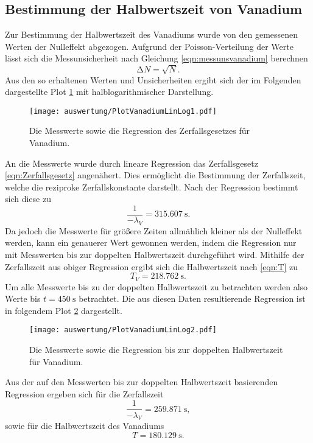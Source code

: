 \subsection{Bestimmung der Halbwertszeit von Vanadium}
  \label{sec:vanadium1}
  Zur Bestimmung der Halbwertszeit des Vanadiums wurde von den gemessenen Werten der Nulleffekt abgezogen. Aufgrund der Poisson-Verteilung der Werte lässt sich die Messunsicherheit nach
  Gleichung \eqref{eqn:messunsvanadium} berechnen
  \begin{equation}
    \label{eqn:messunsvanadium}
    \increment N = \sqrt{N} .
  \end{equation}
  Aus den so erhaltenen Werten und Unsicherheiten ergibt sich der im Folgenden dargestellte Plot \ref{fig:PlotVanadiumLinLog1} mit halblogarithmischer Darstellung.
  \begin{figure}[H]
    \centering
    \texttt{[image: auswertung/PlotVanadiumLinLog1.pdf]}
    \caption{Die Messwerte sowie die Regression des Zerfallsgesetzes für Vanadium.}
    \label{fig:PlotVanadiumLinLog1}
  \end{figure}
  \noindent
  An die Messwerte wurde durch lineare Regression das Zerfallsgesetz \ref{eqn:Zerfallsgesetz} angenähert. Dies ermöglicht die Bestimmung der Zerfallszeit, welche die reziproke Zerfallskonstante
  darstellt. Nach der Regression bestimmt sich diese zu
  \begin{equation*}
    \frac{1}{-\lambda_{V}} = \SI{315.607}{\second}.
  \end{equation*}
  Da jedoch die Messwerte für größere Zeiten allmählich kleiner als der Nulleffekt werden, kann ein genauerer Wert gewonnen werden, indem die Regression nur mit Messwerten bis zur doppelten
  Halbwertszeit durchgeführt wird. Mithilfe der Zerfallszeit aus obiger Regression ergibt sich die Halbwertszeit nach \ref{eqn:T} zu
  \begin{equation*}
    T_{V} = \SI{218.762}{\second}.
  \end{equation*}
  Um alle Messwerte bis zu der doppelten Halbwertszeit zu betrachten werden also Werte bis $t = \SI{450}{\second}$ betrachtet. Die aus diesen Daten resultierende Regression ist in folgendem
  Plot \ref{fig:PlotVanadiumLinLog2} dargestellt.
  \begin{figure}[H]
    \centering
    \texttt{[image: auswertung/PlotVanadiumLinLog2.pdf]}
    \caption{Die Messwerte sowie die Regression bis zur doppelten Halbwertszeit für Vanadium.}
    \label{fig:PlotVanadiumLinLog2}
  \end{figure}
  \noindent
  Aus der auf den Messwerten bis zur doppelten Halbwertszeit basierenden Regression ergeben sich für die Zerfallszeit
  \begin{equation*}
    \frac{1}{-\lambda_{V}} = \SI{259.871}{\second},
  \end{equation*}
  sowie für die Halbwertszeit des Vanadiums
  \begin{equation*}
    T = \SI{180.129}{\second}.
  \end{equation*}
